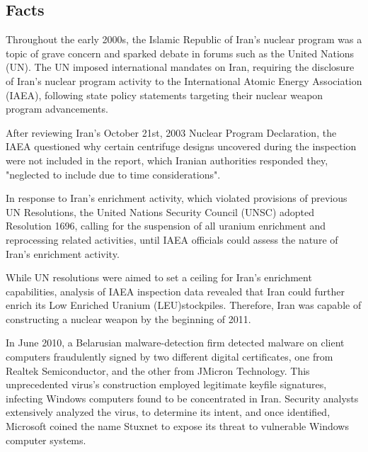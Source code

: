 \documentclass[12pt]{article}
\begin{document}
\begin{multicols}{2}

\section{Facts}

Throughout the early 2000s, the Islamic Republic of Iran's nuclear program was a topic of grave concern and sparked debate in forums such as the United Nations (UN).\cite{unitedNationsResolutions} The UN imposed international mandates on Iran, requiring the disclosure of Iran's nuclear program activity to the International Atomic Energy Association (IAEA), following state policy statements targeting their nuclear weapon program advancements. 

After reviewing Iran's October 21st, 2003 Nuclear Program Declaration, the IAEA questioned why certain centrifuge designs uncovered during the inspection were not included in the report, which Iranian authorities responded they, "neglected to include due to time considerations".\cite{implementationOfNPTSafeguards}

In response to Iran's enrichment activity, which violated provisions of previous UN Resolutions, the United Nations Security Council (UNSC) adopted Resolution 1696, calling for the suspension of all uranium enrichment and reprocessing related activities, until IAEA officials could assess the nature of Iran's enrichment activity.\cite{resolution1696}

While UN resolutions were aimed to set a ceiling for Iran's enrichment capabilities, analysis of IAEA inspection data revealed that Iran could further enrich its Low Enriched Uranium (LEU)\footnotemark[1] stockpiles.  Therefore, Iran was capable of constructing a nuclear weapon by the beginning of 2011.\cite{hasIranAchievedaNuclearWeapon}


In June 2010, a Belarusian malware-detection firm detected malware on client computers fraudulently signed by two different digital certificates, one from Realtek Semiconductor, and the other from JMicron Technology.\cite{theRealStoryOfStuxnet} This unprecedented virus's construction employed legitimate keyfile signatures, infecting Windows computers found to be concentrated in Iran.\cite{w32.stuxnetDossier} Security analysts extensively analyzed the virus, to determine its intent, and once identified, Microsoft coined the name Stuxnet to expose its threat to vulnerable Windows computer systems.\cite{microsoftCoinsStuxnet}


\end{multicols}
\end{document}

